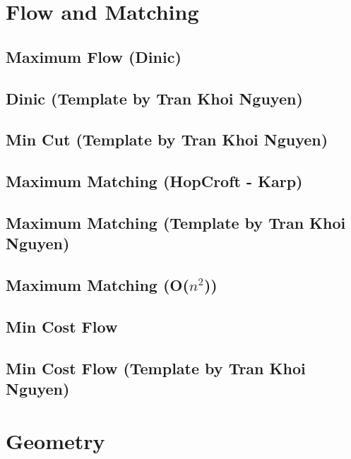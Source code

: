 \section{Flow and Matching}
\subsection{Maximum Flow (Dinic)}
\raggedbottom
\hrulefill
\subsection{Dinic (Template by Tran Khoi Nguyen)}
\raggedbottom
\hrulefill
\subsection{Min Cut (Template by Tran Khoi Nguyen)}
\raggedbottom
\hrulefill
\subsection{Maximum Matching (HopCroft - Karp)}
\raggedbottom
\hrulefill
\subsection{Maximum Matching (Template by Tran Khoi Nguyen)}
\raggedbottom
\hrulefill
\subsection{Maximum Matching (O($n^2$))}
\raggedbottom
\hrulefill
\subsection{Min Cost Flow}
\raggedbottom
\hrulefill
\subsection{Min Cost Flow (Template by Tran Khoi Nguyen)}
\raggedbottom
\hrulefill

\section{Geometry}
